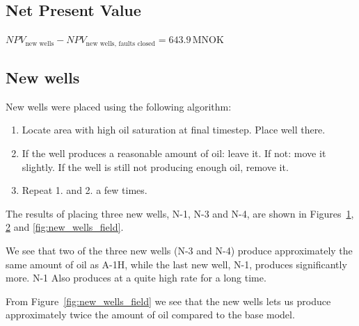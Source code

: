 \documentclass[final]{beamer}
\begin{document}
\begin{frame}[t]
\begin{multicols}{3}
\subsection{Net Present Value} %
\begin{center}
  $NPV_{\text{new wells}} - NPV_{\text{new wells, faults closed}}  = 643.9 \, \mathrm{MNOK}$
\end{center}



\end{multicols}
\end{frame}

\begin{frame}
\begin{multicols}{3}




\section{New wells}
New wells were placed using the following algorithm:
\begin{enumerate}
  \item Locate area with high oil saturation at final timestep. Place well there.
  \item If the well produces a reasonable amount of oil: leave it. If not: move it slightly. If the well is still not producing enough oil, remove it.
  \item Repeat 1. and 2. a few times.
\end{enumerate}
The results of placing three new wells, N-1, N-3 and N-4, are shown in Figures~\ref{fig:new_wells_wopt}, \ref{fig:new_wells_wopr} and \ref{fig:new_wells_field}.

We see that two of the three new wells (N-3 and N-4) produce approximately the same amount of oil as A-1H, while the last new well, N-1, produces significantly more. N-1 Also produces at a quite high rate for a long time.

From Figure~\ref{fig:new_wells_field} we see that the new wells lets us produce approximately twice the amount of oil compared to the base model.

\begin{figure}[H]
  \hspace{-5ex}
  \caption{}
  \label{fig:new_wells_wopt}
\end{figure}

\begin{figure}[H]
  \hspace{-5ex}
  \caption{}
  \label{fig:new_wells_wopr}
\end{figure}



\end{multicols}
\end{frame}
\end{document}
